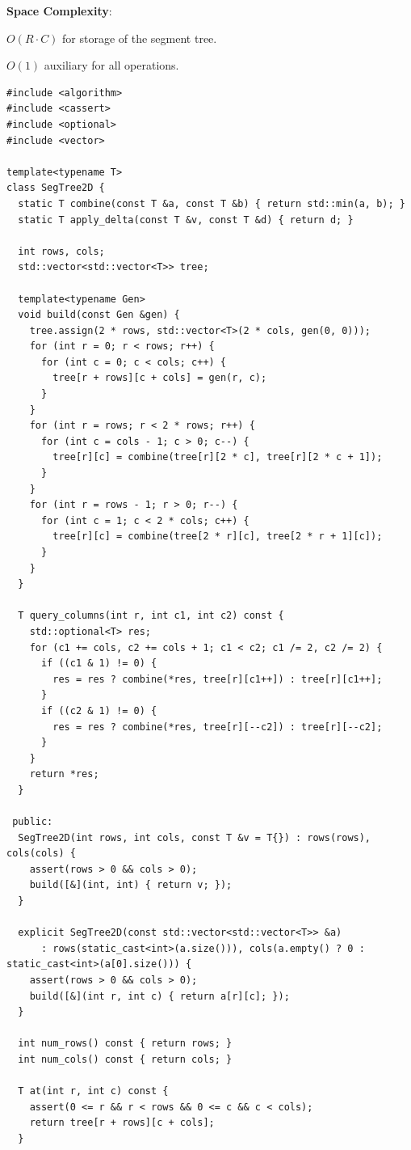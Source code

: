 \textbf{Space Complexity}:
\begin{compactitem}
  \item $O(R \cdot C)$ for storage of the segment tree.
  \item $O(1)$ auxiliary for all operations.
\end{compactitem}

\begin{lstlisting}[style=cpp]
#include <algorithm>
#include <cassert>
#include <optional>
#include <vector>

template<typename T>
class SegTree2D {
  static T combine(const T &a, const T &b) { return std::min(a, b); }
  static T apply_delta(const T &v, const T &d) { return d; }

  int rows, cols;
  std::vector<std::vector<T>> tree;

  template<typename Gen>
  void build(const Gen &gen) {
    tree.assign(2 * rows, std::vector<T>(2 * cols, gen(0, 0)));
    for (int r = 0; r < rows; r++) {
      for (int c = 0; c < cols; c++) {
        tree[r + rows][c + cols] = gen(r, c);
      }
    }
    for (int r = rows; r < 2 * rows; r++) {
      for (int c = cols - 1; c > 0; c--) {
        tree[r][c] = combine(tree[r][2 * c], tree[r][2 * c + 1]);
      }
    }
    for (int r = rows - 1; r > 0; r--) {
      for (int c = 1; c < 2 * cols; c++) {
        tree[r][c] = combine(tree[2 * r][c], tree[2 * r + 1][c]);
      }
    }
  }

  T query_columns(int r, int c1, int c2) const {
    std::optional<T> res;
    for (c1 += cols, c2 += cols + 1; c1 < c2; c1 /= 2, c2 /= 2) {
      if ((c1 & 1) != 0) {
        res = res ? combine(*res, tree[r][c1++]) : tree[r][c1++];
      }
      if ((c2 & 1) != 0) {
        res = res ? combine(*res, tree[r][--c2]) : tree[r][--c2];
      }
    }
    return *res;
  }

 public:
  SegTree2D(int rows, int cols, const T &v = T{}) : rows(rows), cols(cols) {
    assert(rows > 0 && cols > 0);
    build([&](int, int) { return v; });
  }

  explicit SegTree2D(const std::vector<std::vector<T>> &a)
      : rows(static_cast<int>(a.size())), cols(a.empty() ? 0 : static_cast<int>(a[0].size())) {
    assert(rows > 0 && cols > 0);
    build([&](int r, int c) { return a[r][c]; });
  }

  int num_rows() const { return rows; }
  int num_cols() const { return cols; }

  T at(int r, int c) const {
    assert(0 <= r && r < rows && 0 <= c && c < cols);
    return tree[r + rows][c + cols];
  }


\end{lstlisting}
